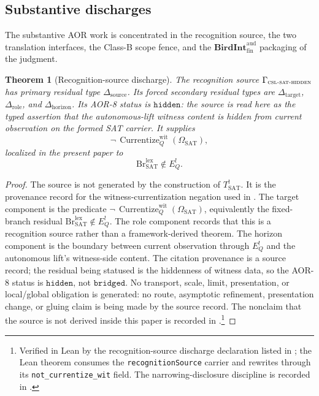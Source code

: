 \documentclass[11pt]{article}
\newcommand{\Tsat}{T^{!}_{\mathrm{SAT}}}
\newcommand{\EQbang}{E^{!}_{Q}}
\newcommand{\OmegaSAT}{\Omega_{\mathrm{SAT}}}
\newcommand{\CurrentizeWit}{\operatorname{Currentize}^{\mathrm{wit}}_{Q}}
\newcommand{\CSLSATHidden}{\Gamma_{\textsc{csl-sat-hidden}}}
\newcommand{\BirdInt}{\mathbf{BirdInt}^{\mathrm{aud}}_{\mathrm{fin}}}
\newtheorem{theorem}{Theorem}[section]
\theoremstyle{definition}
\begin{document}
\subsection{Substantive discharges}

The substantive AOR work is concentrated in the recognition source,
the two translation interfaces, the Class-B scope fence, and the
\(\BirdInt\) packaging of the judgment.

\begin{theorem}[Recognition-source discharge]
\label{thm:pvnp:aor:recognition-source-discharge}
The recognition source \(\CSLSATHidden\) has primary residual type
\(\Delta_{\mathrm{source}}\).  Its forced secondary residual types are
\(\Delta_{\mathrm{target}}\), \(\Delta_{\mathrm{role}}\), and
\(\Delta_{\mathrm{horizon}}\).  Its AOR-8 status is
\(\texttt{hidden}\): the source is read here as the typed assertion
that the autonomous-lift witness content is hidden from current
observation on the formed SAT carrier.  It supplies
\[
  \neg\,\CurrentizeWit(\OmegaSAT),
\]
localized in the present paper to
\[
  \mathrm{Br}^{\mathrm{lex}}_{\mathrm{SAT}}\notin\EQbang .
\]
\end{theorem}

\begin{proof}
The source is not generated by the construction of \(\Tsat\).  It is
the provenance record for the witness-currentization negation used in
.  The target component
is the predicate \(\neg\,\CurrentizeWit(\OmegaSAT)\), equivalently the
fixed-branch residual
\(\mathrm{Br}^{\mathrm{lex}}_{\mathrm{SAT}}\notin\EQbang\).  The role
component records that this is a recognition source rather than a
framework-derived theorem.  The horizon component is the boundary
between current observation through \(\EQbang\) and the autonomous
lift's witness-side content.  The citation provenance is a source
record; the residual being statused is the hiddenness of witness data,
so the AOR-8 status is \(\texttt{hidden}\), not \(\texttt{bridged}\).
No transport, scale, limit, presentation, or local/global obligation
is generated: no route, asymptotic refinement, presentation change, or
gluing claim is being made by the source record.  The nonclaim that the
source is not derived inside this paper is recorded in
.\footnote{Verified in Lean
by the recognition-source discharge declaration listed in
; the Lean theorem consumes the
\texttt{recognitionSource} carrier and rewrites through its
\texttt{not\_currentize\_wit} field.  The
narrowing-disclosure discipline is recorded in
.}
\end{proof}
\end{document}
